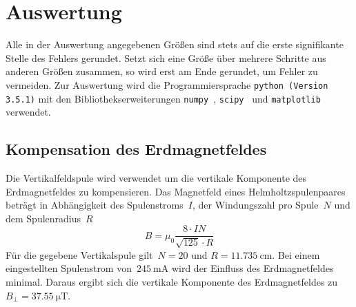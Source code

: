 \section{Auswertung}
\label{sec:auswertung}

Alle in der Auswertung angegebenen Größen sind stets auf die erste signifikante
Stelle des Fehlers gerundet. Setzt sich eine Größe über mehrere Schritte aus
anderen Größen zusammen, so wird erst am Ende gerundet, um Fehler zu vermeiden.
Zur Auswertung wird die Programmiersprache \texttt{python (Version 3.5.1)} mit
den Bibliothekserweiterungen \texttt{numpy}~\cite{numpy},
\texttt{scipy}~\cite{scipy} und \texttt{matplotlib}~\cite{matplotlib} verwendet.

\subsection{Kompensation des Erdmagnetfeldes}
Die Vertikalfeldspule wird verwendet um die vertikale Komponente des
Erdmagnetfeldes zu kompensieren. Das Magnetfeld eines Helmholtzspulenpaares
beträgt in Abhängigkeit des Spulenstroms~$I$, der Windungszahl pro Spule~$N$ und
dem Spulenradius~$R$
%
\begin{equation}
  B = \mu_0\frac{8\cdot IN}{\sqrt{125}\cdot R}
  \label{eq:bfeld}
\end{equation}
%
Für die gegebene Vertikalspule gilt~$N=20$ und $R=\SI{11.735}{\centi\metre}$.
Bei einem eingestellten Spulenstrom von~$\SI{245}{\milli\ampere}$ wird der
Einfluss des Erdmagnetfeldes minimal. Daraus ergibt sich die vertikale
Komponente des Erdmagnetfeldes zu~$B_{\bot}=\SI{37.55}{\micro\tesla}$.


